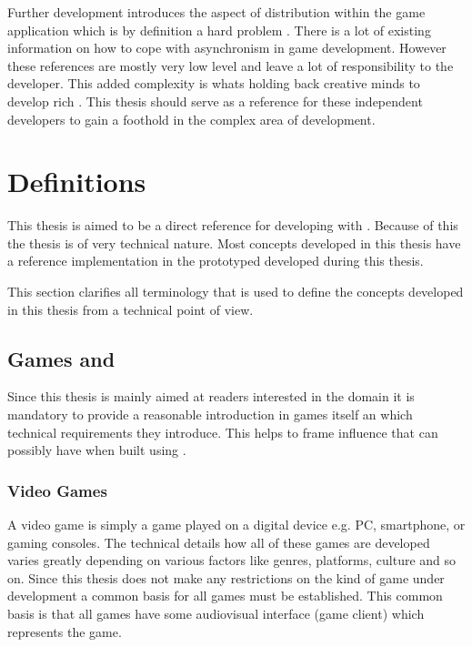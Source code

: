 Further \og{} development introduces the aspect of distribution within the game
application which is by definition a hard problem . There
is a lot of existing information on how to cope with asynchronism in game
development. However these references are mostly very low
level and leave a lot of responsibility to the developer. This added complexity
is whats holding back creative minds to develop rich \ogs{}. This thesis should
serve as a reference for these independent developers to gain a foothold in the
complex area of \og{} development.

\section{Definitions}

This thesis is aimed to be a direct reference for developing \ogs{} with \mss{}.
Because of this the thesis is of very technical nature. Most concepts developed
in this thesis have a reference implementation in the prototyped developed
during this thesis. 

This section clarifies all terminology that is used to define the concepts
developed in this thesis from a technical point of view.

\subsection{Games and \ogs{}}

Since this thesis is mainly aimed at readers interested in the \ms{} domain it
is mandatory to provide a reasonable introduction in games itself an which
technical requirements they introduce. This helps to frame influence that \ogs{}
can possibly have when built using \mss{}.

\subsubsection{Video Games}

A video game is simply a game played on a digital device e.g. PC, smartphone, or
gaming consoles. The technical details how all of these games are developed
varies greatly depending on various factors like genres, platforms, culture and
so on. Since this thesis does not make any restrictions on the kind of game
under development a common basis for all games must be established. This common
basis is that all games have some audiovisual interface (game client) which
represents the game. 

